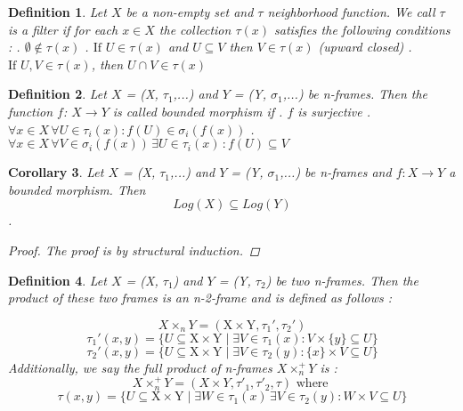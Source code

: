 \documentclass[12pt, a4paper]{scrartcl}
\newtheorem{definition}{Definition}[subsection]
\newtheorem{corollary}[definition]{Corollary}
\begin{document}
\begin{definition}
    Let $X$ be a non-empty set and $\tau$ neighborhood function. We call $\tau$ is a filter if for each $x\in X$ the collection $\tau(x)$
    satisfies the following conditions : \newline {}. $\emptyset \notin \tau(x)$ . $\mbox{If }U \in \tau(x)$ and $U \subseteq V$ then $V \in \tau(x)$ (upward closed) . $\mbox{If }U, V \in \tau(x)$, then $U \cap V \in \tau(x)$
\end{definition}

\begin{definition}
    Let $X$ = (X, $\tau_1$,...) and $Y$ = (Y, $\sigma_1$,...) be n-frames. Then the function $f$:
    $X \rightarrow Y$ is called bounded morphism if \newline {}. $f$ is surjective . $\forall x\in X \, \forall U \in \tau_i(x) : f(U) \in \sigma_i (f(x))$ . $\forall x\in X \, \forall V \in \sigma_i (f(x)) \, \exists U \in \tau_i(x) \, : f(U) \subseteq V$        
\end{definition}

\begin{corollary}
     Let $X$ = (X, $\tau_1$,...) and $Y$ = (Y, $\sigma_1$,...) be n-frames and $f : X \rightarrow Y$ a bounded morphism. Then 
     $$Log(X) \subseteq Log(Y)$$. \newline
     \begin{proof}
        The proof is by structural induction.
     \end{proof}
\end{corollary}


\begin{definition}
    Let $X$ = (X, $\tau_1$) and $Y$ = (Y, $\tau_2$) be two n-frames. Then the product of these two frames
    is an n-2-frame and is defined as follows : \newline
    
    $$ X \times_n Y = (\mbox{X} \times \mbox{Y}, \tau_1', \tau_2')$$   
    $$ \tau_1'(x,y) = \{ U \subseteq \mbox{X} \times \mbox{Y} \mid \exists V \in \tau_1(x) : V \times  \{ y \} \subseteq U \}$$
    $$ \tau_2'(x,y) = \{ U \subseteq \mbox{X} \times \mbox{Y} \mid \exists V \in \tau_2(y) : \{ x \} \times V \subseteq U \}$$
    Additionally, we say the full product of n-frames $X \times^+_n Y$ is :
    $$ X \times^+_n Y = (X \times Y, \tau'_1, \tau'_2, \tau)\mbox{ where }$$
    $$ \tau(x,y) = \{ U \subseteq \mbox{X} \times \mbox{Y} \mid \exists W \in \tau_1(x) \, \exists V \in \tau_2(y) : W \times V \subseteq U \}$$        
\end{definition}
\end{document}
